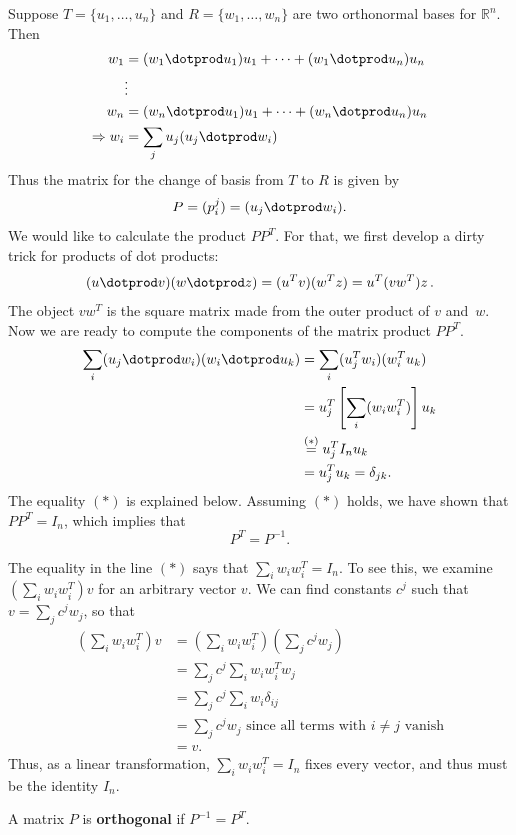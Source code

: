 Suppose $T=\{u_1, \ldots, u_n \}$ and $R=\{w_1, \ldots, w_n \}$ are two orthonormal bases for $\mathbb{R}^n$.  Then\\[3mm]
\begin{align*}
w_1 &= (w_1\dotprod u_1) u_1 + \cdots + (w_1\dotprod u_n)u_n\\
 & \vdots \\
w_n &= (w_n\dotprod u_1) u_1 + \cdots + (w_n\dotprod u_n)u_n\\
\Rightarrow w_i &= \sum_j u_j(u_j\dotprod w_i)
\end{align*}
Thus the matrix for the change of basis from $T$ to $R$ is given by 
\[
P = (p^j_i) = (u_j\dotprod w_i).
\]
We would like to calculate the product $PP^T$. For that, we first develop a dirty trick for products of dot products:
\[
(u\dotprod v)(w\dotprod z)=(u^T v) (w^T z) = u^T (v w^T) z\, . 
\]
The object $v w^T$ is the square matrix made from the outer product of $v$ and~$w$. 
Now we are ready to compute the components of the matrix product $PP^T$.
\begin{align*}
\sum_i(u_j\dotprod w_i)(w_i\dotprod u_k)&=
 \sum_i(u_j^T w_i) (w_i^T u_k)\\
&= u_j^T \left[\sum_i (w_i w_i^T) \right] u_k \\
&\stackrel{(*)}= u_j^T I_n u_k \\\
&= u_j^T u_k = \delta_{jk}.
\end{align*}
The equality $(*)$ is explained below.  Assuming $(*)$ holds, we have shown that $PP^T=I_n$, which implies that 
\[
P^T=P^{-1}.
\]

The equality in the line $(*)$ says that $\sum_i w_i w_i^T=I_n$.  To see this, we examine $\left(\sum_i w_i w_i^T\right)v$ for an arbitrary vector $v$.  We can find constants $c^j$ such that $v=\sum_j c^jw_j$, so that
\begin{align*}
\left(\sum_i w_i w_i^T\right)v
&= \left(\sum_i w_i w_i^T\right)\left(\sum_j c^jw_j\right) \\
&= \sum_j c^j \sum_i w_i w_i^T w_j \\
&= \sum_j c^j \sum_i w_i \delta_{ij} \\
&= \sum_j c^j w_j \text{ since all terms with $i\neq j$ vanish}\\
&=v.
\end{align*}
Thus, as a linear transformation, $\sum_i w_i w_i^T=I_n$ fixes every vector, and thus must be the identity $I_n$.

\begin{definition}
A matrix $P$ is {\bfseries orthogonal} if $P^{-1}=P^T$.
\end{definition}

